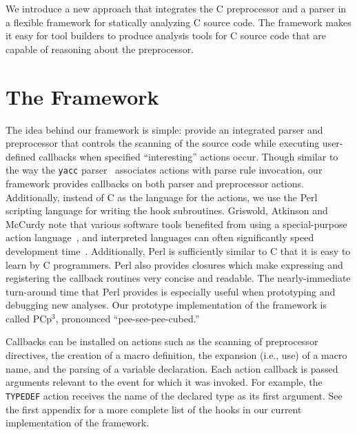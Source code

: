 \documentclass{article}
\newcommand{\pcp}{\mbox{\textsf{PCp}$^3$}}
\newcommand{\Perl}{\mbox{Perl}}
\newcommand{\C}{\mbox{C}}
\newcommand{\ie}{i.e.,}
\begin{document}
We introduce a new approach that integrates the \C{} preprocessor and a
parser in a flexible framework for statically analyzing \C{}
source code.  The framework makes it easy for tool builders to produce
analysis tools for \C{} source code that are capable of reasoning about the
preprocessor.



\section*{The Framework}
\label{sec:framework}

The idea behind our framework is simple: provide an integrated parser
and preprocessor that controls the scanning of the source code while
executing user-defined callbacks when specified ``interesting'' actions occur.
Though similar to the way the \texttt{yacc} parser~\cite{Levine92}
associates actions with parse rule invocation, our framework provides
callbacks on both parser and preprocessor actions. Additionally,
instead of \C{} as the language for the actions, we use the \Perl{} scripting
language for writing the hook subroutines.  Griswold, Atkinson and McCurdy note
that various software tools benefited from using a special-purpose
action language~\cite{Griswold96}, and interpreted languages can
often significantly speed development time~\cite{Scripting}.
Additionally, \Perl{} is sufficiently similar to \C{} that it is easy to 
learn by \C{} programmers.  \Perl{} also provides closures which make
expressing and registering the callback routines very concise and
readable. The nearly-immediate turn-around time that
\Perl{} provides is especially useful when prototyping and debugging new 
analyses.  Our prototype implementation of the framework is called
\pcp{}, pronounced ``pee-see-pee-cubed.''


Callbacks can be installed on actions such as the scanning of preprocessor directives, the
creation of a macro definition, the expansion (\ie{} use) of a macro
name, and the parsing of a variable declaration.  Each action callback
is passed arguments relevant to the event for which it was invoked.  For
example, the \texttt{TYPEDEF} action receives the name of the declared
type as its first argument.  See the first appendix
for a more complete list of the hooks in our current implementation of
the framework.
\end{document}
